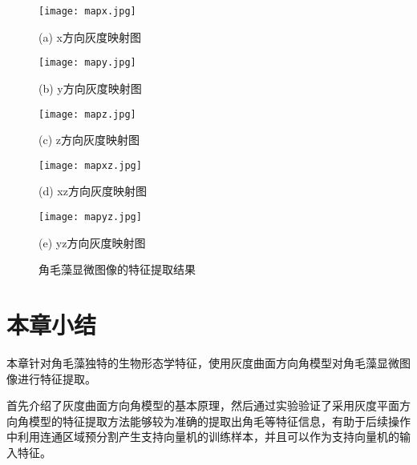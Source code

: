 \begin{figure}[ht!]
\centering
    \begin{minipage}[b]{0.45\linewidth}
    \centering
    \texttt{[image: mapx.jpg]}
      \centerline{(a) x方向灰度映射图}\medskip
  \end{minipage}
  \begin{minipage}[b]{0.45\linewidth}
    \centering
    \texttt{[image: mapy.jpg]}
      \centerline{(b) y方向灰度映射图}\medskip
  \end{minipage}
   \begin{minipage}[b]{0.45\linewidth}
    \centering
    \texttt{[image: mapz.jpg]}
      \centerline{(c) z方向灰度映射图}\medskip
  \end{minipage}
  \begin{minipage}[b]{0.45\linewidth}
    \centering
    \texttt{[image: mapxz.jpg]}
      \centerline{(d) xz方向灰度映射图}\medskip
  \end{minipage}
   \begin{minipage}[b]{0.45\linewidth}
    \centering
    \texttt{[image: mapyz.jpg]}
      \centerline{(e) yz方向灰度映射图}\medskip
  \end{minipage}
 \caption{角毛藻显微图像的特征提取结果}
  \label{GSDAMresults}
\end{figure}


\section{本章小结}
本章针对角毛藻独特的生物形态学特征，使用灰度曲面方向角模型对角毛藻显微图像进行特征提取。

首先介绍了灰度曲面方向角模型的基本原理，然后通过实验验证了采用灰度平面方向角模型的特征提取方法能够较为准确的提取出角毛等特征信息，有助于后续操作中利用连通区域预分割产生支持向量机的训练样本，并且可以作为支持向量机的输入特征。

